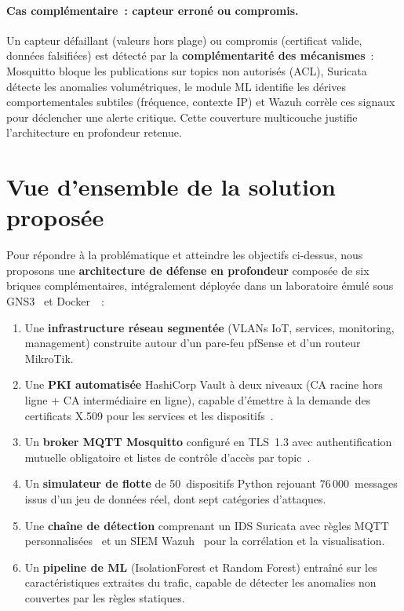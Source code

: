 \paragraph{Cas complémentaire~: capteur erroné ou compromis.}
Un capteur défaillant (valeurs hors plage) ou compromis (certificat valide, données falsifiées) est détecté par la \textbf{complémentarité des mécanismes}~: Mosquitto bloque les publications sur topics non autorisés (ACL), Suricata détecte les anomalies volumétriques, le module ML identifie les dérives comportementales subtiles (fréquence, contexte IP) et Wazuh corrèle ces signaux pour déclencher une alerte critique. Cette couverture multicouche justifie l'architecture en profondeur retenue.

\section{Vue d'ensemble de la solution proposée}
\label{sec:solution-proposee}

Pour répondre à la problématique et atteindre les objectifs ci-dessus, nous proposons une \textbf{architecture de défense en profondeur} composée de six briques complémentaires, intégralement déployée dans un laboratoire émulé sous GNS3~\cite{gns3_docs} et Docker~\cite{docker_docs}~:

\begin{enumerate}[leftmargin=*]
	\item Une \textbf{infrastructure réseau segmentée} (VLANs IoT, services, monitoring, management) construite autour d'un pare-feu pfSense et d'un routeur MikroTik.
	\item Une \textbf{PKI automatisée} HashiCorp Vault à deux niveaux (CA racine hors ligne + CA intermédiaire en ligne), capable d'émettre à la demande des certificats X.509 pour les services et les dispositifs~\cite{vault_pki}.
	\item Un \textbf{broker MQTT Mosquitto} configuré en TLS~1.3 avec authentification mutuelle obligatoire et listes de contrôle d'accès par topic~\cite{mosquitto_tls}.
	\item Un \textbf{simulateur de flotte} de 50~dispositifs Python rejouant 76\,000~messages issus d'un jeu de données réel, dont sept catégories d'attaques.
	\item Une \textbf{chaîne de détection} comprenant un IDS Suricata avec règles MQTT personnalisées~\cite{suricata_mqtt} et un SIEM Wazuh~\cite{wazuh_docs} pour la corrélation et la visualisation.
	\item Un \textbf{pipeline de ML} (IsolationForest et Random Forest) entraîné sur les caractéristiques extraites du trafic, capable de détecter les anomalies non couvertes par les règles statiques.
\end{enumerate}

